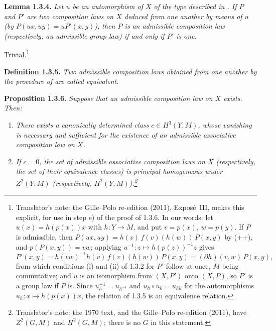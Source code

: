 \medskip
\noindent{}\textbf{Lemma 1.3.4.}
\textit{Let \(u\) be an automorphism of \(X\) of the type described in
. If \(P\) and \(P'\) are two composition laws on \(X\) deduced
from one another by means of \(u\) \textup{(}by \(P(ux,uy)=uP'(x,y)\)\textup{)},
then \(P\) is an admissible composition law \textup{(}respectively, an
admissible group law\textup{)} if and only if \(P'\) is one.}

Trivial.\footnote{Translator's note: the Gille--Polo re-edition (2011), Exposé~III, makes this explicit, for use in step e)
of the proof of 1.3.6. In our words: let \(u(x)=h(p(x))x\) with
\(h\colon Y\to M\), and put \(v=p(x)\), \(w=p(y)\). If \(P\) is admissible,
then \(P(ux,uy)=h(v)\,f(v)(h(w))\,P(x,y)\) by (++), and
\(p(P(x,y))=vw\); applying \(u^{-1}\colon z\mapsto h(p(z))^{-1}z\) gives
\[
 P'(x,y)=h(vw)^{-1}h(v)\,f(v)(h(w))\,P(x,y)=(\partial h)(v,w)\,P(x,y),
\]
from which conditions (i) and (ii) of 1.3.2 for \(P'\) follow at once,
\(M\) being commutative; and \(u\) is an isomorphism from \((X,P')\) onto
\((X,P)\), so \(P'\) is a group law if \(P\) is. Since \(u_h^{-1}=u_{h^{-1}}\)
and \(u_h\circ u_k=u_{hk}\) for the automorphisms \(u_h\colon x\mapsto
h(p(x))x\), the relation of 1.3.5 is an equivalence relation.}

\medskip
\noindent{}\textbf{Definition 1.3.5.}
\textit{Two admissible composition laws obtained from one another by
the procedure of  are called \emph{equivalent}.}

\medskip
\noindent{}\textbf{Proposition 1.3.6.}
\textit{Suppose that an admissible composition law on \(X\) exists.
Then:}
\begin{enumerate}
 \item[\SGAInlineRefTarget{sga3:iii:proposition:1-3-6:item:i}(i)] \textit{There exists a canonically determined class
 \(c\in H^3(Y,M)\), whose vanishing is necessary and sufficient for
 the existence of an admissible associative composition law on \(X\).}

 \item[\SGAInlineRefTarget{sga3:iii:proposition:1-3-6:item:ii}(ii)] \textit{If \(c=0\), the set of admissible associative
 composition laws on \(X\) (respectively, the set of their equivalence
 classes) is principal homogeneous under \(Z^2(Y,M)\) (respectively,
 \(H^2(Y,M)\)).\footnote{Translator's note: the 1970 text, and the Gille--Polo
 re-edition (2011), have \(Z^2(G,M)\) and \(H^2(G,M)\); there is no \(G\) in
 this statement.}}
\end{enumerate}

